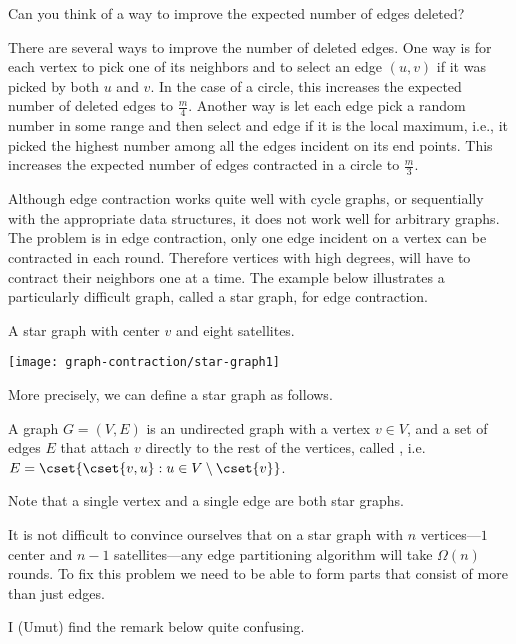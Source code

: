 {\begin{question}
  Can you think of a way to improve the expected number of edges
  deleted?
\end{question}

There are several ways to improve the number of deleted edges.  One
way is for each vertex to pick one of its neighbors and to select an
edge $(u,v)$ if it was picked by both $u$ and $v$.  In the case of a
circle, this increases the expected number of deleted edges to
$\frac{m}{4}$. 
%
Another way is let each edge pick a random number in some range and
then select and edge if it is the local maximum, i.e., it picked the
highest number among all the edges incident on its end points. This
increases the expected number of edges contracted in a circle to
$\frac{m}{3}$.

Although edge contraction works quite well with cycle graphs, or
sequentially with the appropriate data structures, it does not 
work well for arbitrary graphs.  The problem is in edge contraction, only one edge incident on a vertex can be
contracted in each round.  Therefore vertices with high degrees, will
have to contract their neighbors one at a time.  The example below
illustrates a particularly difficult graph, called a star graph, for
edge contraction.
%
\begin{example}
\label{ex:gc::star}
A star graph with center $v$ and eight satellites.
  \begin{center}
  \texttt{[image: graph-contraction/star-graph1]}
  \end{center}
\end{example}


More precisely, we can define a star graph as follows.
\begin{definition}
  A  graph $G = (V,E)$ is an undirected graph with a
   vertex $v \in V$, and a set of edges $E$ that attach
  $v$ directly to the rest of the vertices, called
  , i.e. $E = \cset{\cset{v,u} : u
    \in V \setminus \cset{v}}$.
\end{definition}
Note that a single vertex and a single edge are both star graphs.


It is not difficult to convince ourselves that on a star graph with
$n$ vertices---$1$ center and $n-1$ satellites---any edge partitioning
algorithm will take $\Omega(n)$ rounds.  To fix this problem we need
to be able to form parts that consist of more than just edges.

\begin{todo}
I (Umut) find the remark below quite confusing. 
\end{todo}

}
